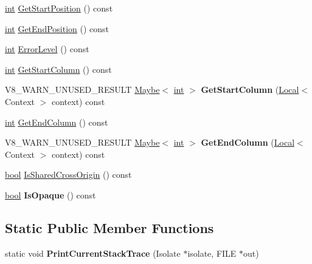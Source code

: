 \begin{DoxyCompactItemize}
\item 
\mbox{\hyperlink{classint}{int}} \mbox{\hyperlink{classv8_1_1Message_a8c32ad25c164ecec1bae0293449589f4}{Get\+Start\+Position}} () const
\item 
\mbox{\hyperlink{classint}{int}} \mbox{\hyperlink{classv8_1_1Message_a9a6c55ffea2eb6841d67afec40300641}{Get\+End\+Position}} () const
\item 
\mbox{\hyperlink{classint}{int}} \mbox{\hyperlink{classv8_1_1Message_a91bb679f695d82c2c2228645ca4497c6}{Error\+Level}} () const
\item 
\mbox{\hyperlink{classint}{int}} \mbox{\hyperlink{classv8_1_1Message_a3be9714cc977899bc1c935b00a140969}{Get\+Start\+Column}} () const
\item 
\mbox{\label{classv8_1_1Message_af7f5aed382217f272a1385d0daeb9e6e}} 
V8\+\_\+\+W\+A\+R\+N\+\_\+\+U\+N\+U\+S\+E\+D\+\_\+\+R\+E\+S\+U\+LT \mbox{\hyperlink{classv8_1_1Maybe}{Maybe}}$<$ \mbox{\hyperlink{classint}{int}} $>$ {\bfseries Get\+Start\+Column} (\mbox{\hyperlink{classv8_1_1Local}{Local}}$<$ Context $>$ context) const
\item 
\mbox{\hyperlink{classint}{int}} \mbox{\hyperlink{classv8_1_1Message_ae188ca2457adbb3628681782bc757dc8}{Get\+End\+Column}} () const
\item 
\mbox{\label{classv8_1_1Message_aada2dff815696d0c426831867532b82c}} 
V8\+\_\+\+W\+A\+R\+N\+\_\+\+U\+N\+U\+S\+E\+D\+\_\+\+R\+E\+S\+U\+LT \mbox{\hyperlink{classv8_1_1Maybe}{Maybe}}$<$ \mbox{\hyperlink{classint}{int}} $>$ {\bfseries Get\+End\+Column} (\mbox{\hyperlink{classv8_1_1Local}{Local}}$<$ Context $>$ context) const
\item 
\mbox{\hyperlink{classbool}{bool}} \mbox{\hyperlink{classv8_1_1Message_a60e48ec814c324c443043dfaf366590a}{Is\+Shared\+Cross\+Origin}} () const
\item 
\mbox{\label{classv8_1_1Message_adc719181a3b29658bb250c6f27bf60d8}} 
\mbox{\hyperlink{classbool}{bool}} {\bfseries Is\+Opaque} () const
\end{DoxyCompactItemize}
\subsection*{Static Public Member Functions}
\begin{DoxyCompactItemize}
\item 
\mbox{\label{classv8_1_1Message_ad4df9ee617243ef01c9a4cb7b08597d4}} 
static void {\bfseries Print\+Current\+Stack\+Trace} (Isolate $\ast$isolate, F\+I\+LE $\ast$out)
\end{DoxyCompactItemize}
